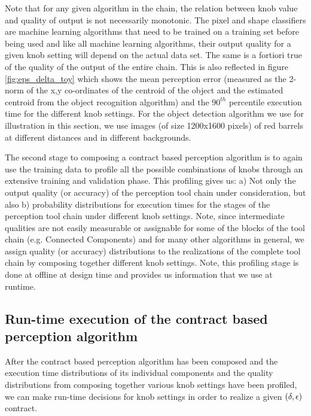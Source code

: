 Note that for any given algorithm in the chain, the relation between knob value and quality of output is not necessarily monotonic. The pixel and shape classifiers are machine learning algorithms that need to be trained on a training set before being used and like all machine learning algorithms, their output quality for a given knob setting will depend on the actual data set.
The same is a fortiori true of the quality of the output of the entire chain. This is also reflected in figure \ref{fig:eps_delta_toy} which shows the mean perception error (measured as the 2-norm of the x,y co-ordinates of the centroid of the object and the estimated centroid from the object recognition algorithm) and the $90^{th}$ percentile execution time for the different knob settings. For the object detection algorithm we use for illustration in this section, we use images (of size 1200x1600 pixels) of red barrels at different distances and in different backgrounds.

The second stage to composing a contract based perception algorithm is to again use the training data to profile all the possible combinations of knobs through an extensive training and validation phase. This profiling gives us: a) Not only the output quality (or accuracy) of the perception tool chain under consideration, but also b) probability distributions for execution times for the stages of the perception tool chain under different knob settings. Note, since intermediate qualities are not easily measurable or assignable for some of the blocks of the tool chain (e.g. Connected Components) and for many other algorithms in general, we assign quality (or accuracy) distributions to the realizations of the complete tool chain by composing together different knob settings. Note, this profiling stage is done at offline at design time and provides us information that we use at runtime.

\subsection{Run-time execution of the contract based perception algorithm}

After the contract based perception algorithm has been composed and the execution time distributions of its individual components and the quality distributions from composing together various knob settings have been profiled, we can make run-time decisions for knob settings in order to realize a given $(\delta,\epsilon)$ contract. 

